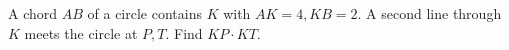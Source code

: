 A chord $AB$ of a circle contains $K$ with $AK=4,KB=2$. A second line through $K$ meets the circle at $P,T$. Find $KP\cdot KT$.
